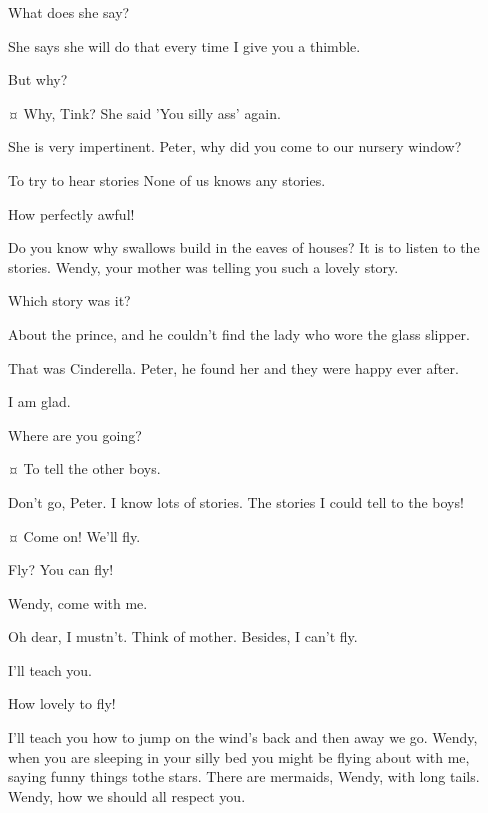 \begin{drama}
\wendyspeaks
What does she say?

\peterspeaks
She says she will do that every time I give you a thimble.

\wendyspeaks
But why?

\peterspeaks {}¤
Why, Tink?
She said 'You silly ass' again.

\wendyspeaks
She is very impertinent.
Peter, why did you come to our nursery window?

\peterspeaks
To try to hear stories None of us knows any stories.

\wendyspeaks
How perfectly awful!

\peterspeaks
Do you know why swallows build in the eaves of houses?
It is to listen to the stories.
Wendy, your mother was telling you such a lovely story.

\wendyspeaks
Which story was it?

\peterspeaks
About the prince, and he couldn't find the lady who wore the glass slipper.

\wendyspeaks
That was Cinderella.
Peter, he found her and they were happy ever after.

\peterspeaks
I am glad.

\wendyspeaks
Where are you going?

\peterspeaks {}¤
To tell the other boys.

\wendyspeaks
Don't go, Peter.
I know lots of stories.
The stories I could tell to the boys!

\peterspeaks {}¤
Come on!
We'll fly.

\wendyspeaks
Fly?
You can fly!


\peterspeaks
Wendy, come with me.

\wendyspeaks
Oh dear, I mustn't.
Think of mother.
Besides, I can't fly.

\peterspeaks
I'll teach you.

\wendyspeaks
How lovely to fly!

\peterspeaks
I'll teach you how to jump on the wind's back and then away we go.
Wendy, when you are sleeping in your silly bed you might be flying about with me, saying funny things tothe stars.
There are mermaids, Wendy, with long tails.
Wendy, how we should all respect you.


\end{drama}

